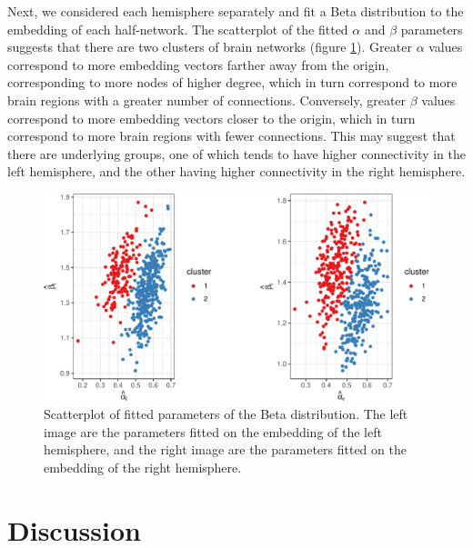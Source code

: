 \documentclass[12pt]{article}
\begin{document}
Next, we considered each hemisphere separately and fit a Beta
distribution to the embedding of each half-network. The scatterplot of
the fitted \(\alpha\) and \(\beta\) parameters suggests that there are
two clusters of brain networks (figure \ref{fig:hcp-clustering}).
Greater \(\alpha\) values correspond to more embedding vectors farther
away from the origin, corresponding to more nodes of higher degree,
which in turn correspond to more brain regions with a greater number of
connections. Conversely, greater \(\beta\) values correspond to more
embedding vectors closer to the origin, which in turn correspond to more
brain regions with fewer connections. This may suggest that there are
underlying groups, one of which tends to have higher connectivity in the
left hemisphere, and the other having higher connectivity in the right
hemisphere.

\begin{figure}[H]

{\centering \includegraphics{draft_files/figure-latex/hcp-clustering-1} 

}

\caption{Scatterplot of fitted parameters of the Beta distribution. The left image are the parameters fitted on the embedding of the left hemisphere, and the right image are the parameters fitted on the embedding of the right hemisphere.}\label{fig:hcp-clustering}
\end{figure}

\hypertarget{discussion}{%
\section{Discussion}\label{discussion}}

\newpage


\renewcommand\refname{Bibliography}

\end{document}
